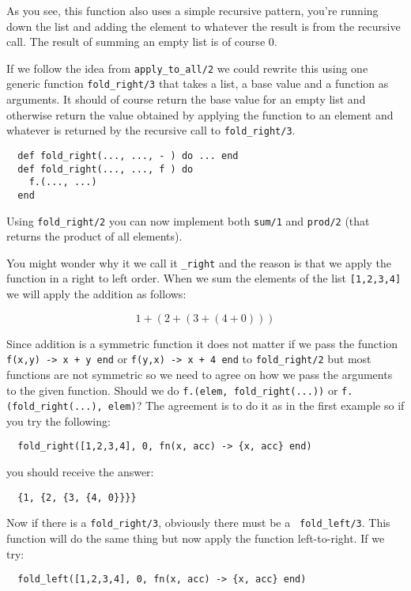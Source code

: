\documentclass[a4paper,11pt]{article}
\begin{document}
As you see, this function also uses a simple recursive pattern, you're
running down the list and adding the element to whatever the result is
from the recursive call. The result of summing an empty list is of
course $0$.

If we follow the idea from {\tt apply\_to\_all/2} we could rewrite this
using one generic function {\tt fold\_right/3} that takes a list, a
base value and a function as arguments. It should of course return the
base value for an empty list and otherwise return the value obtained
by applying the function to an element and whatever is returned by the
recursive call to {\tt fold\_right/3}.


\begin{verbatim}
  def fold_right(..., ..., - ) do ... end
  def fold_right(..., ..., f ) do
    f.(..., ...) 
  end  
\end{verbatim}

Using {\tt fold\_right/2} you can now implement both {\tt sum/1} and
{\tt prod/2} (that returns the product of all elements).

You might wonder why it we call it {\tt \_right} and the reason is that
we apply the function in a right to left order. When we sum the
elements of the list {\tt [1,2,3,4]} we will apply the addition as follows:

$$  1 + (2 + (3 + (4 + 0)))$$

Since addition is a symmetric function it does not matter if we pass
the function {\tt f(x,y) -> x + y end} or {\tt f(y,x) -> x + 4 end} to
{\tt fold\_right/2} but most functions are not symmetric so we need to
agree on how we pass the arguments to the given function. Should we do
{\tt f.(elem, fold\_right(...))} or {\tt f.(fold\_right(...), elem)}?
The agreement is to do it as in the first example so if you try the
following:

\begin{verbatim}
  fold_right([1,2,3,4], 0, fn(x, acc) -> {x, acc} end)
\end{verbatim}

you should receive the answer:

\begin{verbatim}
  {1, {2, {3, {4, 0}}}}
\end{verbatim}

Now if there is a {\tt fold\_right/3}, obviously there must be a {\tt
  fold\_left/3}. This function will do the same thing but now apply the
function left-to-right. If we try:

\begin{verbatim}
  fold_left([1,2,3,4], 0, fn(x, acc) -> {x, acc} end)
\end{verbatim}
\end{document}
